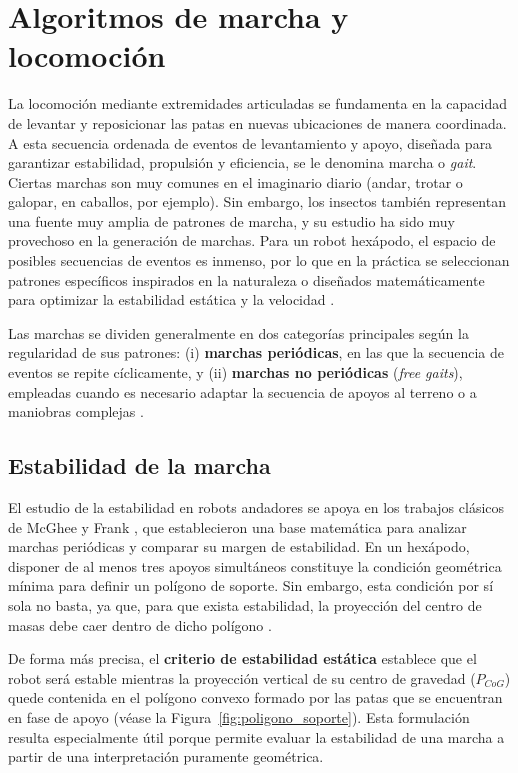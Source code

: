 \section{Algoritmos de marcha y locomoción}
\label{subsec:gaits}

La locomoción mediante extremidades articuladas se fundamenta en la capacidad de levantar y reposicionar las patas en nuevas ubicaciones de manera coordinada. A esta secuencia ordenada de eventos de levantamiento y apoyo, diseñada para garantizar estabilidad, propulsión y eficiencia, se le denomina marcha o \textit{gait}. Ciertas marchas son muy comunes en el imaginario diario (andar, trotar o galopar, en caballos, por ejemplo). Sin embargo, los insectos también representan una fuente muy amplia de patrones de marcha, y su estudio ha sido muy provechoso en la generación de marchas. Para un robot hexápodo, el espacio de posibles secuencias de eventos es inmenso, por lo que en la práctica se seleccionan patrones específicos inspirados en la naturaleza o diseñados matemáticamente para optimizar la estabilidad estática y la velocidad \cite{siciliano2016springer}.

Las marchas se dividen generalmente en dos categorías principales según la regularidad de sus patrones: (i) \textbf{marchas periódicas}, en las que la secuencia de eventos se repite cíclicamente, y (ii) \textbf{marchas no periódicas} (\textit{free gaits}), empleadas cuando es necesario adaptar la secuencia de apoyos al terreno o a maniobras complejas \cite{siciliano2016springer,duan2009tripod}.

\subsection{Estabilidad de la marcha}
\label{subsec:mcghee_frank}

El estudio de la estabilidad en robots andadores se apoya en los trabajos clásicos de McGhee y Frank \cite{McGhee1968}, que establecieron una base matemática para analizar marchas periódicas y comparar su margen de estabilidad. En un hexápodo, disponer de al menos tres apoyos simultáneos constituye la condición geométrica mínima para definir un polígono de soporte. Sin embargo, esta condición por sí sola no basta, ya que, para que exista estabilidad, la proyección del centro de masas debe caer dentro de dicho polígono \cite{siciliano2016springer}.

De forma más precisa, el \textbf{criterio de estabilidad estática} establece que el robot será estable mientras la proyección vertical de su centro de gravedad ($P_{CoG}$) quede contenida en el polígono convexo formado por las patas que se encuentran en fase de apoyo (véase la Figura~\ref{fig:poligono_soporte}). Esta formulación resulta especialmente útil porque permite evaluar la estabilidad de una marcha a partir de una interpretación puramente geométrica.

